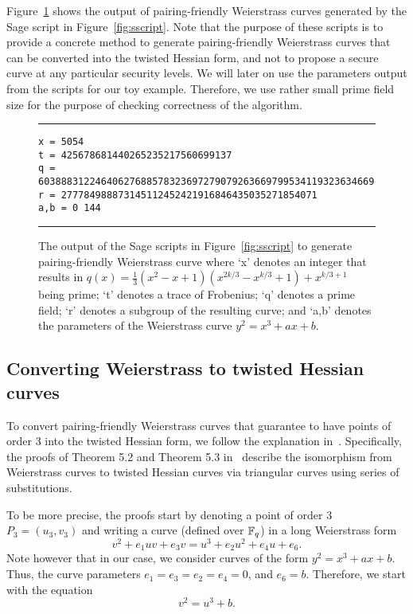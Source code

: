 Figure~\ref{fig:sout} shows the output of
pairing-friendly Weierstrass curves generated by the Sage script in Figure~\ref{fig:sscript}.
Note that the purpose of these scripts is to provide a concrete method to generate
pairing-friendly Weierstrass curves that can be converted into the twisted Hessian form,
and not to propose a secure curve at any particular security levels.
We will later on use the parameters output from the scripts for our toy example.
Therefore, we use rather small prime field size for the purpose of checking correctness of the algorithm.

\begin{figure}
\hrule\medskip
{\scriptsize
\begin{verbatim}
x = 5054
t = 425678681440265235217560699137
q = 60388831224640627688578323697279079263669799534119323634669
r = 277784988873145112452421916846435035271854071
a,b = 0 144
\end{verbatim}
}
\hrule
\caption{The output of the Sage scripts in Figure~\ref{fig:sscript}
to generate pairing-friendly Weierstrass curve where
`x' denotes an integer that results in $q(x) = \frac{1}{3} (x^2 - x + 1) (x^{2k/3} - x^{k/3} + 1) + x^{k/3+1}$ being prime;
`t' denotes a trace of Frobenius;
`q' denotes a prime field;
`r' denotes a subgroup of the resulting curve; and
`a,b' denotes the parameters of the Weierstrass curve $y^2 = x^3 + ax + b$.
}
\label{fig:sout}
\end{figure}



\subsection{Converting Weierstrass to twisted Hessian curves}
\label{subsec:w2h}

To convert pairing-friendly Weierstrass curves that guarantee to have points of order 3
into the twisted Hessian form, we follow the explanation in~\cite{2015/hessian}.
Specifically, the proofs of Theorem 5.2 and {Theorem 5.3} in~\cite{2015/hessian} describe the isomorphism from
Weierstrass curves to twisted Hessian curves via triangular curves using series of substitutions.

To be more precise, the proofs start by denoting a point of order 3 $P_3 = (u_3,v_3)$ and
writing a curve (defined over $\mathbb{F}_{q}$) in a long Weierstrass form
$$ v^2 + e_1 uv + e_3 v = u^3 + e_2 u^2 + e_4 u + e_6. $$
Note however that in our case, we consider curves of the form $y^2 = x^3 + ax + b$.
Thus, the curve parameters $e_1 = e_3 = e_2 = e_4 = 0$, and $e_6 = b$.
Therefore, we start with the equation
$$v^2 = u^3 + b.$$

